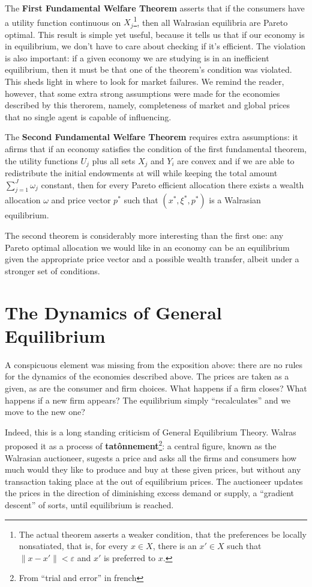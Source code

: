 The \textbf{First Fundamental Welfare Theorem} asserts that if the consumers have
a utility function continuous on $X_j$\footnote{The actual theorem
  asserts a weaker condition, that the preferences be locally
  nonsatiated, that is, for every $x \in X$, there is an $x' \in X$
  such that $\|x - x'\| < \varepsilon$ and $x'$ is preferred to $x$.},
then all Walrasian equilibria are Pareto optimal. This result is
simple yet useful, because it tells us that if our economy is in
equilibrium, we don't have to care about checking if it's
efficient. The violation is also important: if a given economy we are
studying is in an inefficient equilibrium, then it must be that one of
the theorem's condition was violated. This sheds light in where to
look for market failures. We remind the reader, however, that some
extra strong assumptions were made for the economies described by this
therorem, namely, completeness of market and global prices that
no single agent is capable of influencing.

The \textbf{Second Fundamental Welfare Theorem} requires extra
assumptions: it afirms that if an economy satisfies the condition of
the first fundamental theorem, the utility functions $U_j$ plus all
sets $X_j$ and $Y_i$ are convex and if we are able to redistribute the
initial endowments at will while keeping the total amount
$\sum_{j=1}^J \omega_j$ constant, then for every Pareto efficient
allocation there exists a wealth allocation $\omega$ and price vector
$p^\ast$ such that $(x^\ast, \xi^\ast, p^\ast)$ is a Walrasian
equilibrium.

The second theorem is considerably more interesting than the first
one: any Pareto optimal allocation we would like in an economy can be
an equilibrium given the appropriate price vector and a possible
wealth transfer, albeit under a stronger set of conditions.

\section{The Dynamics of General Equilibrium}

A conspicuous element was missing from the exposition above: there are
no rules for the dynamics of the economies described above. The prices
are taken as a given, as are the consumer and firm choices. What
happens if a firm closes? What happens if a new firm appears? The
equilibrium simply ``recalculates'' and we move to the new one?

Indeed, this is a long standing criticism of General Equilibrium
Theory. Walras proposed it as a process of
\textbf{tatônnement}\footnote{From ``trial and error'' in french}: a
central figure, known as the Walrasian auctioneer, sugests a price and
asks all the firms and consumers how much would they like to produce
and buy at these given prices, but without any transaction taking
place at the out of equilibrium prices. The auctioneer updates the
prices in the direction of diminishing excess demand or supply, a
``gradient descent'' of sorts, until equilibrium is reached.



\cite{thurner} \cite{Schumpeter39} \cite{savage} \cite{mascolell}
\cite{Roughgarden10, Gintis07}
\cite{Tversky74, Kahneman79, Tversky81}
